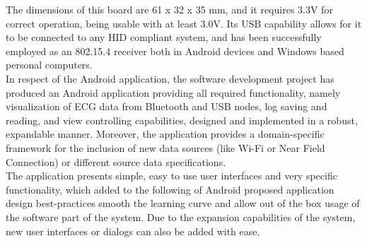 		The dimensions of this board are 61 x 32 x 35 mm, and it requires 3.3V for correct operation, being usable with at least 3.0V. Its USB capability allows for it to be connected to any HID compliant system, and has been successfully employed as an 802.15.4 receiver both in Android devices and Windows based personal computers.\\

		In respect of the Android application, the software development project has produced an Android application providing all required functionality, namely visualization of ECG data from Bluetooth and USB nodes, log saving and reading, and view controlling capabilities, designed and implemented in a robust, expandable manner. Moreover, the application provides a domain-specific framework for the inclusion of new data sources (like Wi-Fi or Near Field Connection) or different source data specifications.\\

		The application presents simple, easy to use user interfaces and very specific functionality, which added to the following of Android proposed application design best-practices smooth the learning curve and allow out of the box usage of the software part of the system. Due to the expansion capabilities of the system, new user interfaces or dialogs can also be added with ease.\\
	
